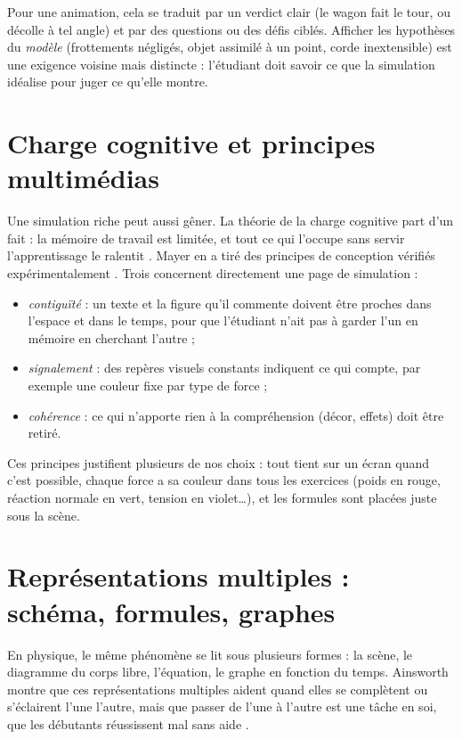Pour une animation, cela se traduit par un verdict clair (le wagon fait le
tour, ou décolle à tel angle) et par des questions ou des défis ciblés.
Afficher les hypothèses du \emph{modèle} (frottements négligés, objet
assimilé à un point, corde inextensible) est une exigence voisine mais
distincte : l'étudiant doit savoir ce que la simulation idéalise pour juger
ce qu'elle montre.

\section{Charge cognitive et principes multimédias}

Une simulation riche peut aussi gêner. La théorie de la charge cognitive part
d'un fait : la mémoire de travail est limitée, et tout ce qui l'occupe sans
servir l'apprentissage le ralentit \cite{sweller1988}. Mayer en a tiré des
principes de conception vérifiés expérimentalement \cite{mayer2009}. Trois
concernent directement une page de simulation :
\begin{itemize}
  \item \emph{contiguïté} : un texte et la figure qu'il commente doivent être
        proches dans l'espace et dans le temps, pour que l'étudiant n'ait pas
        à garder l'un en mémoire en cherchant l'autre ;
  \item \emph{signalement} : des repères visuels constants indiquent ce qui
        compte, par exemple une couleur fixe par type de force ;
  \item \emph{cohérence} : ce qui n'apporte rien à la compréhension (décor,
        effets) doit être retiré.
\end{itemize}
Ces principes justifient plusieurs de nos choix : tout tient sur un écran
quand c'est possible, chaque force a sa couleur dans tous les exercices
(poids en rouge, réaction normale en vert, tension en violet…), et les
formules sont placées juste sous la scène.

\section{Représentations multiples : schéma, formules, graphes}

En physique, le même phénomène se lit sous plusieurs formes : la scène, le
diagramme du corps libre, l'équation, le graphe en fonction du temps.
Ainsworth montre que ces représentations multiples aident quand elles se
complètent ou s'éclairent l'une l'autre, mais que passer de l'une à l'autre
est une tâche en soi, que les débutants réussissent mal sans aide
\cite{ainsworth2006deft}.

